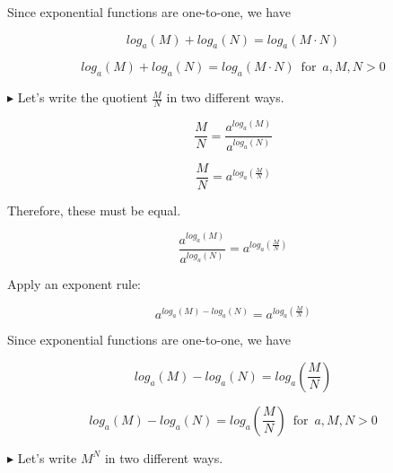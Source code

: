 \documentclass{ximera}
\begin{document}
Since exponential functions are one-to-one, we have 


\[    log_a(M)+log_a(N)    =   log_a(M \cdot N)               \]




\begin{template} 

\[    log_a(M)+log_a(N)    =   log_a(M \cdot N)      \, \text{ for } \, a, M, N > 0        \]


\end{template}




$\blacktriangleright$  Let's write the quotient $\frac{M}{N}$ in two different ways.



\[   \frac{M}{N} = \frac{a^{log_a(M)}}{a^{log_a(N)}}                    \]

\[   \frac{M}{N} = a^{log_a\left(\frac{M}{N}\right)}                  \]


Therefore, these must be equal.


\[    \frac{a^{log_a(M)}}{a^{log_a(N)}}    =   a^{log_a\left(\frac{M}{N}\right)}                \]


Apply an exponent rule:


\[    a^{log_a(M) - log_a(N)}    =   a^{log_a\left(\frac{M}{N}\right)}                \]



Since exponential functions are one-to-one, we have 


\[    log_a(M)-log_a(N)    =   log_a\left(\frac{M}{N}\right)             \]








\begin{template} 

\[    log_a(M)-log_a(N)    =   log_a\left(\frac{M}{N}\right)        \, \text{ for } \, a, M, N > 0        \]


\end{template}




















$\blacktriangleright$  Let's write $M^N$ in two different ways.
\end{document}
